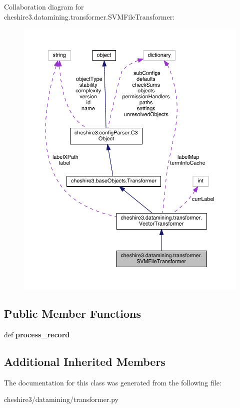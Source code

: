 Collaboration diagram for cheshire3.\-datamining.\-transformer.\-S\-V\-M\-File\-Transformer\-:
\nopagebreak
\begin{figure}[H]
\begin{center}
\leavevmode
\includegraphics[width=350pt]{classcheshire3_1_1datamining_1_1transformer_1_1_s_v_m_file_transformer__coll__graph}
\end{center}
\end{figure}
\subsection*{Public Member Functions}
\begin{DoxyCompactItemize}
\item 
\hypertarget{classcheshire3_1_1datamining_1_1transformer_1_1_s_v_m_file_transformer_a00b6d40b9c193938e994884ef8c314a7}{def {\bfseries process\-\_\-record}}\label{classcheshire3_1_1datamining_1_1transformer_1_1_s_v_m_file_transformer_a00b6d40b9c193938e994884ef8c314a7}

\end{DoxyCompactItemize}
\subsection*{Additional Inherited Members}


The documentation for this class was generated from the following file\-:\begin{DoxyCompactItemize}
\item 
cheshire3/datamining/transformer.\-py\end{DoxyCompactItemize}
